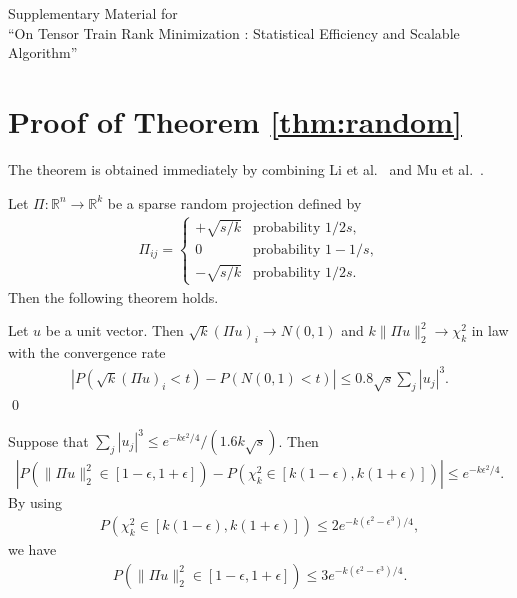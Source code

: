 \appendix

\begin{center}
	\begin{Large}
		Supplementary Material for \\
		``On Tensor Train Rank Minimization : Statistical Efficiency and Scalable Algorithm''
	\end{Large}
\end{center}
\fi

\section{Proof of Theorem \ref{thm:random}}

The theorem is obtained immediately by combining Li et al.~\cite{li2006very} and Mu et al.~\cite{mu2011accelerated}.

Let $\Pi: \mathbb{R}^n \to \mathbb{R}^k$ be a sparse random projection defined by 
\begin{align}
  \Pi_{ij} = \begin{cases} +\sqrt{s/k} & \text{probability } 1/2s, \\ 0 & \text{probability } 1 - 1/s, \\ -\sqrt{s/k} & \text{probability } 1/2s. \end{cases}
\end{align}
Then the following theorem holds.
\begin{lemma}
\label{lem:sparseJL}
Let $u$ be a unit vector. Then
$\sqrt{k} (\Pi u)_i \to N(0,1)$ and $k \| \Pi u \|_2^2 \to \chi_k^2$ in law with the convergence rate 
\begin{align}
  |P(\sqrt{k} (\Pi u)_i < t) - P(N(0,1) < t)| \le 0.8 \sqrt{s} \sum_j |u_j|^3.
\end{align}
\qed
\end{lemma}
Suppose that $\sum_j |u_j|^3 \le e^{-k \epsilon^2/4} / (1.6 k \sqrt{s})$. 
Then 
\begin{align}
  |P(\|\Pi u\|_2^2 \in [1-\epsilon, 1+\epsilon]) - P(\chi_k^2  \in [k(1-\epsilon), k(1+\epsilon)])| \le e^{-k \epsilon^2/4}.
\end{align}
By using 
\begin{align}
  P(\chi_k^2  \in [k(1-\epsilon), k(1+\epsilon)]) \le 2 e^{-k (\epsilon^2 - \epsilon^3)/4},
\end{align}
we have
\begin{align}
  P(\| \Pi u \|_2^2 \in [1-\epsilon, 1+\epsilon]) \le 3 e^{-k (\epsilon^2 - \epsilon^3)/4}.
\end{align}

